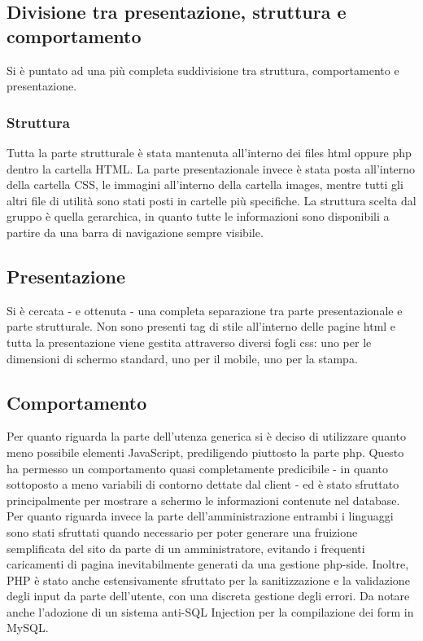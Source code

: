 \subsection{Divisione tra presentazione, struttura e comportamento}
Si è puntato ad una più completa suddivisione tra struttura, comportamento e presentazione.
\subsubsection{Struttura}
Tutta la parte strutturale è stata mantenuta all'interno dei files html oppure php dentro la cartella HTML. La parte presentazionale invece è stata posta all'interno della cartella CSS, le immagini all'interno della cartella images, mentre tutti gli altri file di utilità sono stati posti in cartelle più specifiche. La struttura scelta dal gruppo è quella gerarchica, in quanto tutte le informazioni sono disponibili a partire da una barra di navigazione sempre visibile.
\subsection{Presentazione}
Si è cercata - e ottenuta - una completa separazione tra parte presentazionale e parte strutturale. Non sono presenti tag di stile all'interno delle pagine html e tutta la presentazione viene gestita attraverso diversi fogli css: uno per le dimensioni di schermo standard, uno per il mobile, uno per la stampa.
\subsection{Comportamento}
Per quanto riguarda la parte dell'utenza generica si è deciso di utilizzare quanto meno possibile elementi JavaScript, prediligendo piuttosto la parte php. Questo ha permesso un comportamento quasi completamente predicibile - in quanto sottoposto a meno variabili di contorno dettate dal client - ed è stato sfruttato principalmente per mostrare a schermo le informazioni contenute nel database.
\\Per quanto riguarda invece la parte dell'amministrazione entrambi i linguaggi sono stati sfruttati quando necessario per poter generare una fruizione semplificata del sito da parte di un amministratore, evitando i frequenti caricamenti di pagina inevitabilmente generati da una gestione php-side. Inoltre, PHP è stato anche estensivamente sfruttato per la sanitizzazione e la validazione degli input da parte dell'utente, con una discreta gestione degli errori. Da notare anche l'adozione di un sistema anti-SQL Injection per la compilazione dei form in MySQL.

